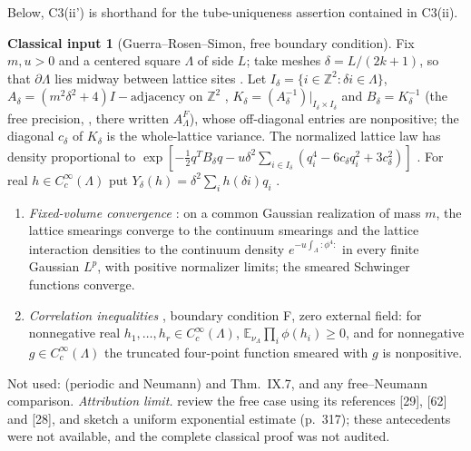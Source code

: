 \documentclass[11pt]{article}
\theoremstyle{plain}
\theoremstyle{definition}
\newtheorem{classical}{Classical input}
\theoremstyle{remark}
\newcommand{\Z}{\mathbb{Z}}
\newcommand{\E}{\mathbb{E}}
\begin{document}
Below, C3(ii') is shorthand for the tube-uniqueness assertion contained in C3(ii).

\begin{classical}[Guerra--Rosen--Simon, free boundary condition]\label{prem:C4}
Fix $m,u>0$ and a centered square $\Lambda$ of side $L$; take meshes
$\delta=L/(2k+1)$, so that $\partial\Lambda$ lies midway between lattice sites
\cite[\S IX.1, pp.~309--310]{GRS1976}. Let $I_\delta=\{i\in\Z^{2}:\delta i\in\Lambda\}$,
$A_\delta=(m^{2}\delta^{2}+4)I-\mathrm{adjacency}$ on $\Z^{2}$
\cite[(IX.2)]{GRS1976}, $K_\delta=(A_\delta^{-1})|_{I_\delta\times I_\delta}$ and
$B_\delta=K_\delta^{-1}$ (the free precision, \cite[(IX.4c), p.~311]{GRS1976}, there
written $A^{F}_\Lambda$), whose off-diagonal entries are nonpositive; the diagonal
$c_\delta$ of $K_\delta$ is the whole-lattice variance. The normalized lattice law
has density proportional to
$\exp[-\tfrac12q^{T}B_\delta q-u\delta^{2}\sum_{i\in I_\delta}(q_i^{4}-6c_\delta q_i^{2}+3c_\delta^{2})]$
\cite[pp.~311--312]{GRS1976}. For real $h\in C_c^{\infty}(\Lambda)$ put
$Y_\delta(h)=\delta^{2}\sum_ih(\delta i)q_i$ \cite[(IX.19), p.~316]{GRS1976}.
\begin{enumerate}[label=(\roman*)]
\item \emph{Fixed-volume convergence} \cite[(IX.19)--(IX.21), p.~316; Lemmas~IX.3
  (with the remark covering the sharp indicator of $\Lambda$) and IX.4, p.~317;
  review to p.~319]{GRS1976}: on a common Gaussian realization of mass $m$, the
  lattice smearings converge to the continuum smearings and the lattice
  interaction densities to the continuum density $e^{-u\int_\Lambda{:}\phi^4{:}}$
  in every finite Gaussian $L^{p}$, with positive normalizer limits; the
  smeared Schwinger functions converge.
\item \emph{Correlation inequalities} \cite[\S IX.2(i),(iii), p.~324]{GRS1976},
  boundary condition F, zero external field: for nonnegative real
  $h_1,\dots,h_r\in C_c^{\infty}(\Lambda)$,
  $\E_{\nu_\Lambda}\prod_i\phi(h_i)\ge0$, and for nonnegative
  $g\in C_c^{\infty}(\Lambda)$ the truncated four-point function smeared with $g$
  is nonpositive.
\end{enumerate}
Not used: \cite[Thm.~IX.5, p.~320]{GRS1976} (periodic and Neumann) and
Thm.~IX.7, and any free--Neumann comparison. \emph{Attribution limit.}
\cite[pp.~316--319]{GRS1976} review the free case using its references [29],
[62] and [28], and sketch a uniform exponential estimate (p.~317); these
antecedents were not available, and the complete classical proof was not audited.
\end{classical}
\end{document}
